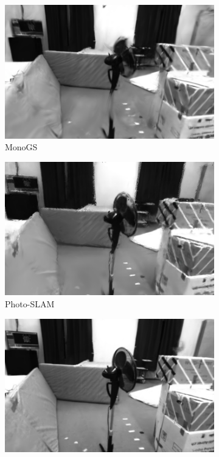 \begin{figure}[ht]
\begin{subfigure}[ht]{0.24\linewidth}
    \end{subfigure}
    \begin{subfigure}[ht]{0.24\linewidth}
        \includegraphics[width=1\linewidth]{fig/fig_mono/euroc/MonoGS/01028.png}
        \caption{MonoGS \cite{MonoGS2024}}
        \label{fig:gull}
    \end{subfigure}
    \begin{subfigure}[ht]{0.24\linewidth}
        \includegraphics[width=1\linewidth]{fig/fig_mono/euroc/Photo-SLAM/14184_304.jpg}
        \caption{Photo-SLAM \cite{Photo-SLAM2024}}
        \label{fig:gull}
    \end{subfigure}
    \begin{subfigure}[ht]{0.24\linewidth}
        \includegraphics[width=1\linewidth]{fig/fig_mono/euroc/HQ-SLAM/30000_1827.jpg}

\end{subfigure}
\end{figure}
